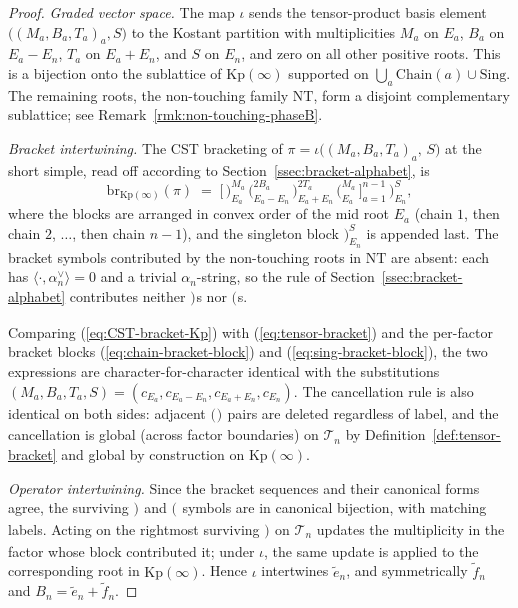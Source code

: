 \documentclass[11pt]{article}
\theoremstyle{definition}
\theoremstyle{remark}
\newcommand{\Kp}{\mathrm{Kp}}
\newcommand{\NT}{\mathrm{NT}}
\newcommand{\Sing}{\mathrm{Sing}}
\newcommand{\Chain}{\mathrm{Chain}}
\newcommand{\TT}{\mathcal{T}}
\newcommand{\br}{\mathrm{br}}
\newcommand{\labr}[1]{{)}_{#1}}
\newcommand{\labl}[1]{{(}_{#1}}
\begin{document}
\begin{proof}
\emph{Graded vector space.} The map $\iota$ sends the tensor-product basis element
$\bigl((M_a, B_a, T_a)_a, S\bigr)$ to the Kostant partition with multiplicities
$M_a$ on $E_a$, $B_a$ on $E_a - E_n$, $T_a$ on $E_a + E_n$, and $S$ on $E_n$, and
zero on all other positive roots. This is a bijection onto the sublattice of
$\Kp(\infty)$ supported on $\bigcup_a \Chain(a) \cup \Sing$. The remaining roots,
the non-touching family $\NT$, form a disjoint complementary sublattice;
see Remark~\ref{rmk:non-touching-phaseB}.

\emph{Bracket intertwining.} The CST bracketing of $\pi = \iota\bigl((M_a, B_a, T_a)_a,\, S\bigr)$
at the short simple, read off according to Section~\ref{ssec:bracket-alphabet}, is
\begin{equation}\label{eq:CST-bracket-Kp}
\br_{\Kp(\infty)}(\pi) \;=\;
\bigl[\,\labr{E_a}^{M_a}\, \labl{E_a - E_n}^{2B_a}\, \labr{E_a + E_n}^{2T_a}\, \labl{E_a}^{M_a}\,\bigr]_{a=1}^{n-1}\,
\labr{E_n}^{S},
\end{equation}
where the blocks are arranged in convex order of the mid root $E_a$
(chain $1$, then chain $2$, $\ldots$, then chain $n-1$), and the singleton
block $\labr{E_n}^S$ is appended last. The bracket symbols contributed by the
non-touching roots in $\NT$ are absent: each has $\langle \cdot, \alpha_n^\vee\rangle = 0$
and a trivial $\alpha_n$-string, so the rule of Section~\ref{ssec:bracket-alphabet}
contributes neither $\labr{}$s nor $\labl{}$s.

Comparing (\ref{eq:CST-bracket-Kp}) with (\ref{eq:tensor-bracket}) and the
per-factor bracket blocks (\ref{eq:chain-bracket-block}) and
(\ref{eq:sing-bracket-block}), the two expressions are character-for-character
identical with the substitutions $(M_a, B_a, T_a, S) = (c_{E_a}, c_{E_a - E_n},
c_{E_a + E_n}, c_{E_n})$. The cancellation rule is also identical on both sides:
adjacent $\labl{}\labr{}$ pairs are deleted regardless of label, and the
cancellation is global (across factor boundaries) on $\TT_n$ by
Definition~\ref{def:tensor-bracket} and global by construction on $\Kp(\infty)$.

\emph{Operator intertwining.} Since the bracket sequences and their canonical
forms agree, the surviving $\labr{}$ and $\labl{}$ symbols are in canonical
bijection, with matching labels. Acting on the rightmost surviving $\labr{}$ on
$\TT_n$ updates the multiplicity in the factor whose block contributed it; under
$\iota$, the same update is applied to the corresponding root in $\Kp(\infty)$.
Hence $\iota$ intertwines $\tilde e_n$, and symmetrically $\tilde f_n$ and
$B_n = \tilde e_n + \tilde f_n$.
\end{proof}
\end{document}
